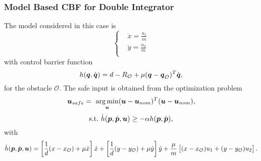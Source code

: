 \subsubsection*{Model Based CBF for Double Integrator}
The model considered in this case is
\begin{equation*}
\left\{ \begin{aligned}
    &\ddot{x}      = \frac{u_1}{m} \\
    &\ddot{y}      = \frac{u_2}{m} \\
\end{aligned} \right.
\end{equation*}
with control barrier function
\begin{equation*}
    h({\boldsymbol{q}},\dot{\boldsymbol{q}})= d - R_{\mathcal{O}}+\mu({\boldsymbol{q}}-{\boldsymbol{q}}_{\mathcal{O}})^T\dot{\boldsymbol{q}},
\end{equation*}
for the obstacle $\mathcal{O}$. The safe input is obtained from the optimization problem
\begin{equation*}
    \boldsymbol{u}_{safe}=~\underset{\boldsymbol{u}}{\arg\min}(\boldsymbol{u}-\boldsymbol{u}_{nom})^T(\boldsymbol{u}-\boldsymbol{u}_{nom}),
\end{equation*}
\begin{equation*}
    \mathrm{s.t.}\,\, \dot{h}(\boldsymbol{p},\dot{\boldsymbol{p}},\boldsymbol{u})\geq -\alpha h(\boldsymbol{p},\dot{\boldsymbol{p}}),
\end{equation*}
with
\begin{equation*}
    \dot{h}(\boldsymbol{p},\dot{\boldsymbol{p}},\boldsymbol{u}) = \left[\frac{1}{d}(x-x_\mathcal{O}) + \mu \dot{x}\right]\dot{x} + \left[\frac{1}{d}(y-y_\mathcal{O}) + \mu \dot{y}\right]\dot{y} + \frac{\mu}{m} \left[ (x-x_\mathcal{O})u_1 + (y-y_\mathcal{O}) u_2 \right].
\end{equation*}

